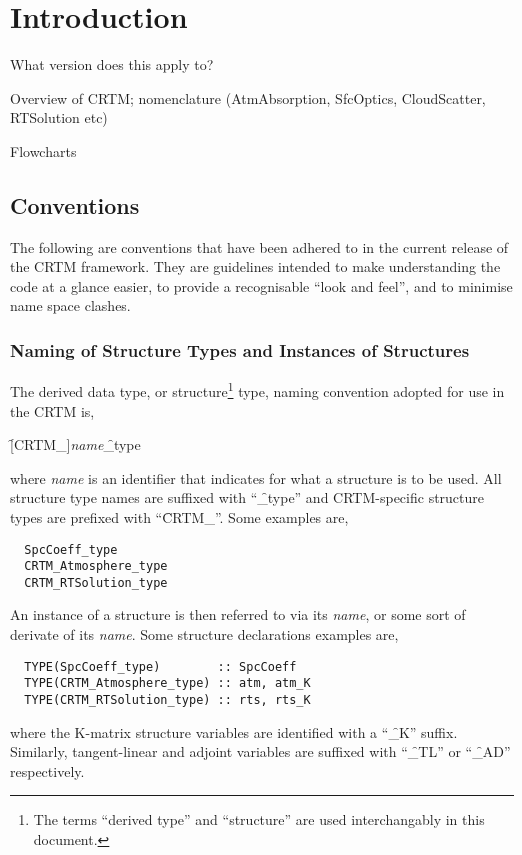 \chapter{Introduction}

What version does this apply to?

Overview of CRTM; nomenclature (AtmAbsorption, SfcOptics, CloudScatter, RTSolution etc)

Flowcharts



\section{Conventions}
\label{sec:conventions}
The following are conventions that have been adhered to in the current release of the CRTM framework. They are guidelines intended to make understanding the code at a glance easier, to provide a recognisable ``look and feel'', and to minimise name space clashes.

\subsection{Naming of Structure Types and Instances of Structures}
The derived data type, or structure\footnote{The terms ``derived type'' and ``structure'' are used interchangably in this document.} type, naming convention adopted for use in the CRTM is, 

\hspace{0.5cm}\f{[CRTM\_]}\textit{name}\f{\_type} 

where \textit{name} is an identifier that indicates for what a structure is to be used. All structure type names are suffixed with ``\f{\_type}'' and CRTM-specific structure types are prefixed with ``\f{CRTM\_}''. Some examples are,
\begin{ttfamily}
  \begin{verbatim}
  SpcCoeff_type
  CRTM_Atmosphere_type
  CRTM_RTSolution_type\end{verbatim}
\end{ttfamily}
An instance of a structure is then referred to via its \textit{name}, or some sort of derivate of its \textit{name}. Some structure declarations examples are,
\begin{ttfamily}
  \begin{verbatim}
  TYPE(SpcCoeff_type)        :: SpcCoeff
  TYPE(CRTM_Atmosphere_type) :: atm, atm_K
  TYPE(CRTM_RTSolution_type) :: rts, rts_K\end{verbatim}
\end{ttfamily}
where the K-matrix structure variables are identified with a ``\f{\_K}'' suffix. Similarly, tangent-linear and adjoint variables are suffixed with ``\f{\_TL}'' or ``\f{\_AD}'' respectively.

